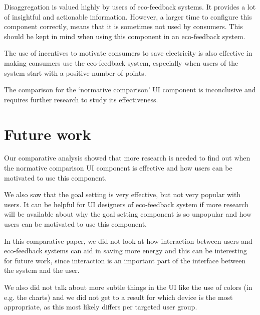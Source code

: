 \documentclass[journal]{vgtc}                %
\begin{document}
Disaggregation is valued highly by users of eco-feedback systems. It provides a lot of insightful and actionable information. However, a larger time to configure this component correctly, means that it is sometimes not used by consumers. This should be kept in mind when using this component in an eco-feedback system.

The use of incentives to motivate consumers to save electricity is also effective in making consumers use the eco-feedback system, especially when users of the system start with a positive number of points.

The comparison for the `normative comparison'  UI component is inconclusive and requires further research to study its effectiveness.


\section{Future work}
Our comparative analysis showed that more research is needed to find out when the normative comparison UI component is effective and how users can be motivated to use this component.

We also saw that the goal setting is very effective, but not very popular with users. It can be helpful for UI designers of eco-feedback system if more research will be available about why the goal setting component is so unpopular and how users can be motivated to use this component.

In this comparative paper, we did not look at how interaction between users and eco-feedback systems can aid in saving more energy and this can be interesting for future work, since interaction is an important part of the interface between the system and the user.

We also did not talk about more subtle things in the UI like the use of colors (in e.g. the charts) and we did not get to a result for which device is the most appropriate, as this most likely differs per targeted user group.




\end{document}
